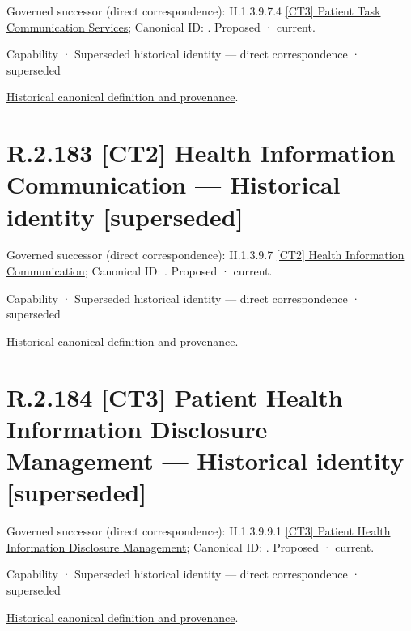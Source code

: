 {\small Governed successor (direct correspondence): II.1.3.9.7.4 \hyperref[element:ba8ce1d54ace4bc9aa3521dd954f36cb]{[CT3] Patient Task Communication Services}; Canonical ID: \texttt{}. Proposed · current.}\par
\label{element:0914f2bb267449e282e9ae0f7407d9fe}
{\small Capability · Superseded historical identity — direct correspondence · superseded}\par
\href{../../../../continuum/strategy/capability/0914f2bb267449e282e9ae0f7407d9fe.md}{Historical canonical definition and provenance}.\par
\section*{R.2.183 [CT2] Health Information Communication — Historical identity [superseded]}
\label{navigation:R.2.183}

{\small Governed successor (direct correspondence): II.1.3.9.7 \hyperref[element:7925605bf60f4b288e826020409a09d9]{[CT2] Health Information Communication}; Canonical ID: \texttt{}. Proposed · current.}\par
\label{element:bcefb378424842fcb6d703208c3f8773}
{\small Capability · Superseded historical identity — direct correspondence · superseded}\par
\href{../../../../continuum/strategy/capability/bcefb378424842fcb6d703208c3f8773.md}{Historical canonical definition and provenance}.\par
\section*{R.2.184 [CT3] Patient Health Information Disclosure Management — Historical identity [superseded]}
\label{navigation:R.2.184}

{\small Governed successor (direct correspondence): II.1.3.9.9.1 \hyperref[element:7f918639e23842e78fa92f1bf47c5a7b]{[CT3] Patient Health Information Disclosure Management}; Canonical ID: \texttt{}. Proposed · current.}\par
\label{element:07cf507f183d4905a7ad2adbb8555df5}
{\small Capability · Superseded historical identity — direct correspondence · superseded}\par
\href{../../../../continuum/strategy/capability/07cf507f183d4905a7ad2adbb8555df5.md}{Historical canonical definition and provenance}.\par
